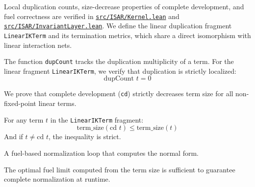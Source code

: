 Local duplication counts, size-decrease properties of complete development, and fuel correctness are verified in \href{https://github.com/cypoe/isar-proofs/blob/master/src/ISAR/Kernel.lean}{\texttt{src/ISAR/Kernel.lean}} and \href{https://github.com/cypoe/isar-proofs/blob/master/src/ISAR/InvariantLayer.lean}{\texttt{src/ISAR/InvariantLayer.lean}}. We define the linear duplication fragment \texttt{LinearIKTerm} and its termination metrics, which share a direct isomorphism with linear interaction nets.

\begin{definition}
The function \texttt{dupCount} tracks the duplication multiplicity of a term. For the linear fragment \texttt{LinearIKTerm}, we verify that duplication is strictly localized:
$$\text{dupCount } t = 0$$
\end{definition}

We prove that complete development (\texttt{cd}) strictly decreases term size for all non-fixed-point linear terms.

\begin{theorem}
For any term $t$ in the \texttt{LinearIKTerm} fragment:
$$\text{term\_size}(\text{cd } t) \leq \text{term\_size}(t)$$
And if $t \neq \text{cd } t$, the inequality is strict.
\end{theorem}

\begin{definition}
A fuel-based normalization loop that computes the normal form.
\end{definition}

\begin{theorem}
The optimal fuel limit computed from the term size is sufficient to guarantee complete normalization at runtime.
\end{theorem}
